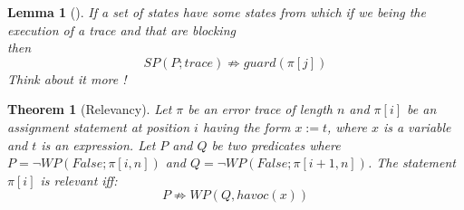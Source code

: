 \documentclass{article}
\newcommand{\limp}{\Rightarrow}
\newtheorem{theorem}{Theorem}
\newtheorem{lemma}{Lemma}
\begin{document}
\begin{lemma}[]\label{lemma:neg_wp_assignment}
If a set of states have some states from which if we being the execution of a trace and that are blocking\\
then $$SP(P; trace)\not \limp guard(\pi[j])$$ 
Think about it more !
\end{lemma}

\newpage
\begin{theorem}[Relevancy]\label{mydef:relevancytheorem}
Let $\pi$ be an error trace of length $n$ and $\pi[i]$ be an assignment statement at position $i$ having the form $x:=t$, where $x$ is a variable and $t$ is an expression. Let $P$ and $Q$ be two predicates where $P = \neg WP(False; \pi[i,n])$ and $Q =  \neg WP(False; \pi[i+1,n])$. The statement $\pi[i]$ is relevant iff:
 $$P \not \limp WP(Q,havoc(x))$$
\end{theorem}
\end{document}
